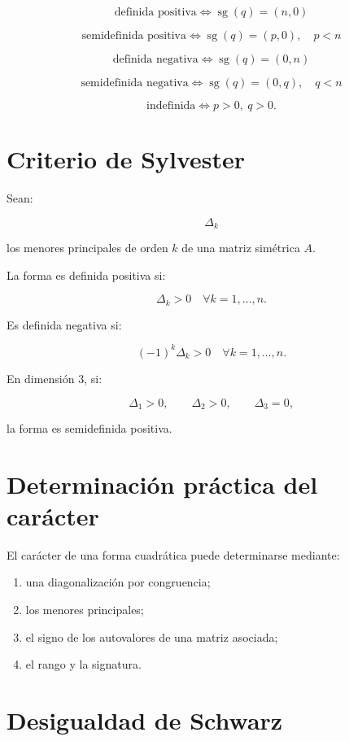 \documentclass[11pt,a4paper]{article}
\newcommand{\sg}{\operatorname{sg}}
\begin{document}
\[
\boxed{
\text{definida positiva}
\iff
\sg(q)=(n,0)
}
\]

\[
\boxed{
\text{semidefinida positiva}
\iff
\sg(q)=(p,0),\quad p<n
}
\]

\[
\boxed{
\text{definida negativa}
\iff
\sg(q)=(0,n)
}
\]

\[
\boxed{
\text{semidefinida negativa}
\iff
\sg(q)=(0,q),\quad q<n
}
\]

\[
\boxed{
\text{indefinida}
\iff
p>0,\ q>0.
}
\]

\section{Criterio de Sylvester}

Sean:

\[
\Delta_k
\]

los menores principales de orden $k$ de una matriz simétrica $A$.

La forma es definida positiva si:

\[
\boxed{
\Delta_k>0
\quad
\forall k=1,\ldots,n.
}
\]

Es definida negativa si:

\[
\boxed{
(-1)^k\Delta_k>0
\quad
\forall k=1,\ldots,n.
}
\]

En dimensión $3$, si:

\[
\Delta_1>0,
\qquad
\Delta_2>0,
\qquad
\Delta_3=0,
\]

la forma es semidefinida positiva.

\section{Determinación práctica del carácter}

El carácter de una forma cuadrática puede determinarse mediante:

\begin{enumerate}
\item una diagonalización por congruencia;
\item los menores principales;
\item el signo de los autovalores de una matriz asociada;
\item el rango y la signatura.
\end{enumerate}

\section{Desigualdad de Schwarz}
\end{document}

